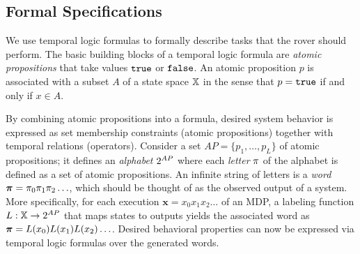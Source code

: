 \documentclass[conference]{IEEEtran}
\begin{document}
\subsection{Formal Specifications}
We use temporal logic formulas to formally describe tasks that the rover should perform. The basic building blocks of a temporal logic formula are \emph{atomic propositions} that take values $\texttt{true}$ or $\texttt{false}$.  An atomic proposition $p$ is associated with a subset $A$ of a state space $\mathbb{X}$ in the sense that $p = \texttt{true}$ if and only if $x \in A$.

By combining atomic propositions into a formula, desired system behavior is expressed as set membership constraints (atomic propositions) together with temporal relations (operators). Consider a set $AP = \{ p_1, \ldots, p_L \}$ of atomic propositions; it defines an \emph{alphabet} ${2^{AP}}$ where each \emph{letter} $\pi$ of the alphabet is defined as a set of atomic propositions. An infinite string of letters is a \emph{word} $\boldsymbol{\pi}=\pi_0\pi_1\pi_2\ldots$, which should be thought of as the observed output of a system. More specifically, for each execution $\mathbf{x} = x_0 x_1 x_2 \ldots$ of an MDP, a labeling function $L: \mathbb{X} \rightarrow {2^{AP}}$ that maps states to outputs yields the associated word as $\boldsymbol{\pi} = L(x_0)L(x_1) L(x_2) \ldots$. Desired behavioral properties can now be expressed via temporal logic formulas over the generated words.
\end{document}
